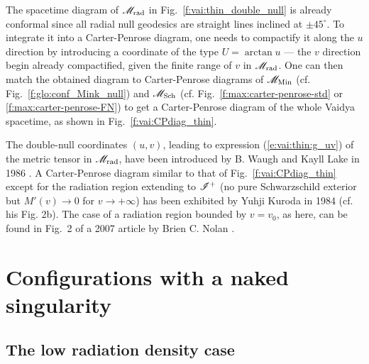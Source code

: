 The spacetime diagram of $\mathscr{M}_{\rm rad}$ in Fig.~\ref{f:vai:thin_double_null}
is already conformal since all radial null geodesics are straight lines
inclined at $\pm 45^\circ$. To integrate it into a Carter-Penrose diagram,
one needs to compactify it along the $u$ direction by introducing a
coordinate of the type $U = \arctan u$ --- the $v$ direction begin already
compactified, given the finite range of $v$ in $\mathscr{M}_{\rm rad}$.
One can then match the obtained diagram to
Carter-Penrose diagrams of $\mathscr{M}_{\rm Min}$ (cf. Fig.~\ref{f:glo:conf_Mink_null})
and $\mathscr{M}_{\rm Sch}$ (cf. Fig.~\ref{f:max:carter-penrose-std} or \ref{f:max:carter-penrose-FN})
to get a Carter-Penrose diagram of the whole Vaidya spacetime, as shown
in Fig.~\ref{f:vai:CPdiag_thin}.

\begin{hist}
The double-null coordinates $(u,v)$, leading to expression (\ref{e:vai:thin:g_uv}) of the
metric tensor in $\mathscr{M}_{\rm rad}$, have been introduced by
B. Waugh and Kayll Lake in 1986 \cite{WaughL86}.
A Carter-Penrose diagram similar to that of Fig.~\ref{f:vai:CPdiag_thin} except
for the radiation region extending to $\mathscr{I}^+$ (no pure Schwarzschild exterior but
$M'(v) \to 0$ for $v\to +\infty$) has been exhibited by Yuhji Kuroda
in 1984 \cite{Kurod84} (cf. his Fig. 2b).
The case of a radiation region bounded by $v = v_0$, as here, can be found in Fig.~2 of a 2007 article by
Brien C. Nolan \cite{Nolan07}.
\end{hist}



\section{Configurations with a naked singularity} \label{s:vai:naked_sing}

\subsection{The low radiation density case} \label{s:vai:low_alpha}

